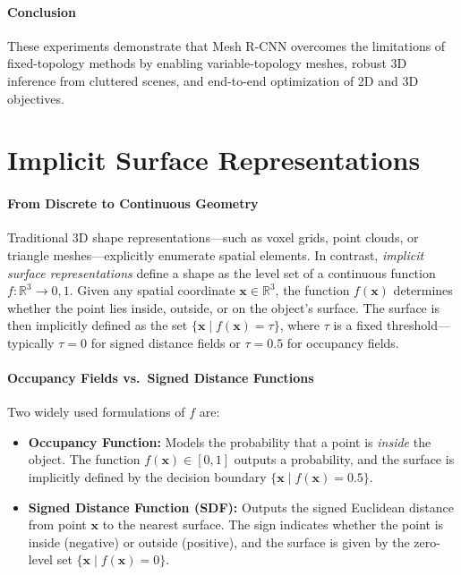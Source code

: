 \paragraph{Conclusion}
These experiments demonstrate that Mesh R-CNN overcomes the limitations of fixed-topology methods by enabling variable-topology meshes, robust 3D inference from cluttered scenes, and end-to-end optimization of 2D and 3D objectives.

\newpage

\section{Implicit Surface Representations}
\label{sec:chapter23_implicit_surfaces}

\paragraph{From Discrete to Continuous Geometry}
Traditional 3D shape representations—such as voxel grids, point clouds, or triangle meshes—explicitly enumerate spatial elements. In contrast, \emph{implicit surface representations} define a shape as the level set of a continuous function \( f : \mathbb{R}^3 \to {0, 1} \). Given any spatial coordinate \( \mathbf{x} \in \mathbb{R}^3 \), the function \( f(\mathbf{x}) \) determines whether the point lies inside, outside, or on the object’s surface. The surface is then implicitly defined as the set \( \{ \mathbf{x} \mid f(\mathbf{x}) = \tau \} \), where \( \tau \) is a fixed threshold—typically \( \tau = 0 \) for signed distance fields or \( \tau = 0.5 \) for occupancy fields.

\paragraph{Occupancy Fields vs.\ Signed Distance Functions}
Two widely used formulations of \( f \) are:

\begin{itemize}
    \item \textbf{Occupancy Function:} Models the probability that a point is \emph{inside} the object. The function \( f(\mathbf{x}) \in [0,1] \) outputs a probability, and the surface is implicitly defined by the decision boundary \( \{ \mathbf{x} \mid f(\mathbf{x}) = 0.5 \} \).
    
    \item \textbf{Signed Distance Function (SDF):} Outputs the signed Euclidean distance from point \( \mathbf{x} \) to the nearest surface. The sign indicates whether the point is inside (negative) or outside (positive), and the surface is given by the zero-level set \( \{ \mathbf{x} \mid f(\mathbf{x}) = 0 \} \).
\end{itemize}

